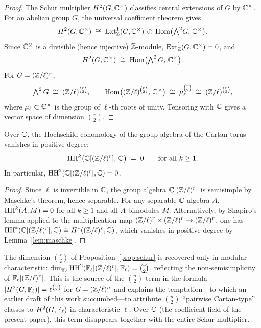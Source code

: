 \begin{proof}
The Schur multiplier $H^2(G, \mathbb{C}^\times)$ classifies central extensions of $G$ by $\mathbb{C}^\times$. For an abelian group $G$, the universal coefficient theorem gives
\[
H^2(G, \mathbb{C}^\times) \;\cong\; \operatorname{Ext}^1_{\mathbb{Z}}(G, \mathbb{C}^\times) \,\oplus\, \operatorname{Hom}\bigl({\textstyle\bigwedge^2} G,\, \mathbb{C}^\times\bigr).
\]
Since $\mathbb{C}^\times$ is a divisible (hence injective) $\mathbb{Z}$-module, $\operatorname{Ext}^1_{\mathbb{Z}}(G, \mathbb{C}^\times) = 0$, and
\[
H^2(G, \mathbb{C}^\times) \;\cong\; \operatorname{Hom}\bigl({\textstyle\bigwedge^2}\, G,\, \mathbb{C}^\times\bigr).
\]
For $G = (\mathbb{Z}/\ell)^r$,
\[
{\textstyle\bigwedge^2}\, G \;\cong\; (\mathbb{Z}/\ell)^{\binom{r}{2}}, \qquad \operatorname{Hom}\bigl((\mathbb{Z}/\ell)^{\binom{r}{2}},\, \mathbb{C}^\times\bigr) \;\cong\; \mu_\ell^{\binom{r}{2}} \;\cong\; (\mathbb{Z}/\ell)^{\binom{r}{2}},
\]
where $\mu_\ell \subset \mathbb{C}^\times$ is the group of $\ell$-th roots of unity. Tensoring with $\mathbb{C}$ gives a vector space of dimension $\binom{r}{2}$.
\end{proof}

\begin{corollary}
\label{cor:schurvanish}
Over $\mathbb{C}$, the Hochschild cohomology of the group algebra of the Cartan torus vanishes in positive degree:
\[
\operatorname{HH}^k\bigl(\mathbb{C}[(\mathbb{Z}/\ell)^r],\, \mathbb{C}\bigr) \;=\; 0 \qquad \text{for all } k \geq 1.
\]
In particular, $\operatorname{HH}^2(\mathbb{C}[(\mathbb{Z}/\ell)^r], \mathbb{C}) = 0$.
\end{corollary}

\begin{proof}
Since $\ell$ is invertible in $\mathbb{C}$, the group algebra $\mathbb{C}[(\mathbb{Z}/\ell)^r]$ is semisimple by Maschke's theorem, hence separable. For any separable $\mathbb{C}$-algebra $A$, $\operatorname{HH}^k(A, M) = 0$ for all $k \geq 1$ and all $A$-bimodules $M$. Alternatively, by Shapiro's lemma applied to the multiplication map $(\mathbb{Z}/\ell)^r \times (\mathbb{Z}/\ell)^r \to (\mathbb{Z}/\ell)^r$, one has $\operatorname{HH}^*(\mathbb{C}[(\mathbb{Z}/\ell)^r], \mathbb{C}) \cong H^*((\mathbb{Z}/\ell)^r, \mathbb{C})$, which vanishes in positive degree by Lemma~\ref{lem:maschke}.
\end{proof}

\begin{remark}
\label{rem:schurmodular}
The dimension $\binom{r}{2}$ of Proposition~\ref{prop:schur} is recovered only in modular characteristic: $\dim_{\mathbb{F}_\ell} \operatorname{HH}^2(\mathbb{F}_\ell[(\mathbb{Z}/\ell)^r], \mathbb{F}_\ell) = \binom{r}{2}$, reflecting the non-semisimplicity of $\mathbb{F}_\ell[(\mathbb{Z}/\ell)^r]$. This is the source of the $\binom{n}{2}$-term in the formula $|H^2(G, \mathbb{F}_\ell)| = \ell^{\binom{n}{2}}$ for $G = (\mathbb{Z}/\ell)^n$ and explains the temptation---to which an earlier draft of this work succumbed---to attribute $\binom{n}{2}$ ``pairwise Cartan-type'' classes to $H^2(G, \mathbb{F}_\ell)$ in characteristic $\ell$. Over $\mathbb{C}$ (the coefficient field of the present paper), this term disappears together with the entire Schur multiplier.
\end{remark}

